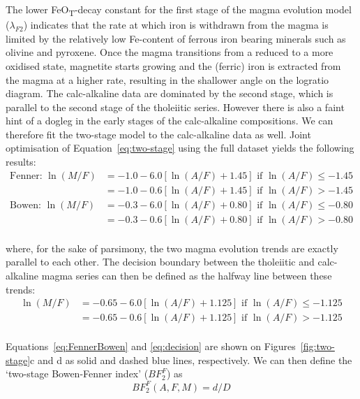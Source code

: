 \documentclass{article}
\begin{document}
The lower FeO\textsubscript{T}-decay constant for the first stage of
the magma evolution model ($\lambda_{F2}$) indicates that the rate at
which iron is withdrawn from the magma is limited by the relatively
low Fe-content of ferrous iron bearing minerals such as olivine and
pyroxene.  Once the magma transitions from a reduced to a more
oxidised state, magnetite starts growing and the (ferric) iron is
extracted from the magma at a higher rate, resulting in the shallower
angle on the logratio diagram.  The calc-alkaline data are dominated
by the second stage, which is parallel to the second stage of the
tholeiitic series. However there is also a faint hint of a dogleg in
the early stages of the calc-alkaline compositions. We can therefore
fit the two-stage model to the calc-alkaline data as well. Joint
optimisation of Equation~\ref{eq:two-stage} using the full
\citet{rollinson2021} dataset yields the following results:
\begin{equation}
  \begin{split}
    \mbox{Fenner:~} \ln(M/F) & = -1.0 - 6.0 [\ln(A/F)+1.45]
    \mbox{~if~} \ln(A/F)\leq{-1.45}\\
    \phantom{\mbox{Fenner:~} \ln(M/F)} & = -1.0 - 0.6 [\ln(A/F)+1.45]
    \mbox{~if~} \ln(A/F)>{-1.45}\\
    \mbox{Bowen:~} \ln(M/F) & = -0.3 - 6.0 [\ln(A/F)+0.80]
    \mbox{~if~} \ln(A/F)\leq{-0.80}\\
    \phantom{\mbox{Bowen:~} \ln(M/F)} & = -0.3 - 0.6 [\ln(A/F)+0.80]
    \mbox{~if~} \ln(A/F)>{-0.80}\\
  \end{split}
  \label{eq:FennerBowen}
\end{equation}

\noindent where, for the sake of parsimony, the two magma evolution
trends are exactly parallel to each other.  The decision boundary
between the tholeiitic and calc-alkaline magma series can then be
defined as the halfway line between these trends:
\begin{equation}
  \begin{split}
    \ln(M/F) & = -0.65 - 6.0 [\ln(A/F)+1.125]
    \mbox{~if~} \ln(A/F)\leq{-1.125}\\
    \phantom{\ln(M/F)} & = -0.65 - 0.6 [\ln(A/F)+1.125]
    \mbox{~if~} \ln(A/F)>{-1.125}\\
  \end{split}
  \label{eq:decision}
\end{equation}

Equations~\ref{eq:FennerBowen} and \ref{eq:decision} are shown on
Figures~\ref{fig:two-stage}c and d as solid and dashed blue lines,
respectively. We can then define the `two-stage Bowen-Fenner index'
($BF_2^F$) as
\begin{equation}
  BF_2^F(A,F,M) = d/D
  \label{eq:BF2F}
\end{equation}
\end{document}
